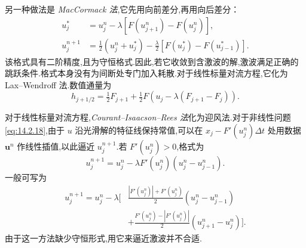 \begin{example}[MacCormack 格式]\label{ex:14.2.maccormack}
另一种做法是 \emph{MacCormack 法},它先用向前差分,再用向后差分：
\begin{equation}\label{eq:14.2.28}
  \begin{aligned}
    u_j^*&=u_j^n-\lambda[F(u_{j+1}^n)-F(u_j^n)],\\
    u_j^{n+1}&=\tfrac12(u_j^n+u_j^*)-\tfrac{\lambda}{2}[F(u_j^*)-F(u_{j-1}^*)].
  \end{aligned}
\end{equation}
该格式具有二阶精度,且为守恒格式.因此,若它收敛到含激波的解,激波满足正确的跳跃条件.格式本身没有为间断处专门加入耗散.对于线性标量对流方程,它化为 Lax--Wendroff 法.数值通量为
\begin{equation}\label{eq:14.2.29}
  h_{j+1/2}=\tfrac12F_{j+1}+\tfrac12F(u_j-\lambda(F_{j+1}-F_j)).
\end{equation}
\end{example}

\begin{example}\label{ex:14.2.cir}
对于线性标量对流方程,\emph{Courant--Isaacson--Rees 法}化为迎风法.对于非线性问题\eqref{eq:14.2.18},由于 \(u\) 沿光滑解的特征线保持常值,可以在 \(x_j-F'(u_j^n)\Delta t\) 处用数据 \(\boldsymbol{u}^n\) 作线性插值,以此逼近 \(u_j^{n+1}\).若 \(F'(u_j^n)>0\),格式为
\[
  u_j^{n+1}=u_j^n-\lambda F'(u_j^n)(u_j^n-u_{j-1}^n).
\]
一般可写为
\begin{equation}\label{eq:14.2.30}
  \begin{aligned}
    u_j^{n+1}=u_j^n-\lambda\biggl[
      &\frac{|F'(u_j^n)|+F'(u_j^n)}{2}(u_j^n-u_{j-1}^n)\\
      &+\frac{F'(u_j^n)-|F'(u_j^n)|}{2}(u_{j+1}^n-u_j^n)\biggr].
  \end{aligned}
\end{equation}
由于这一方法缺少守恒形式,用它来逼近激波并不合适.
\end{example}

